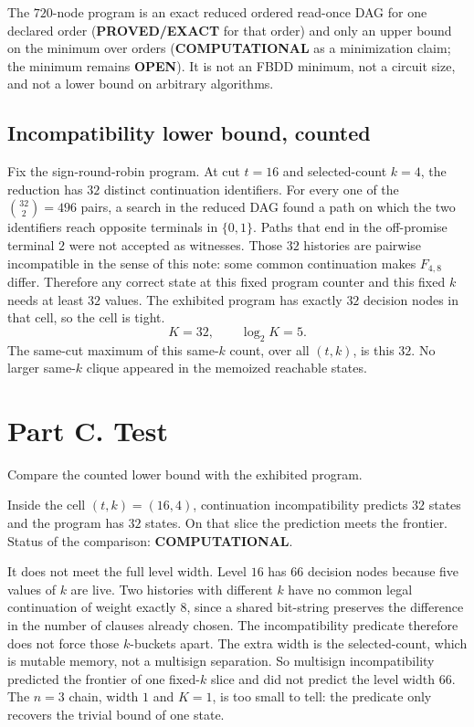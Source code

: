\documentclass[11pt]{article}
\begin{document}
The \(720\)-node program is an exact reduced ordered read-once DAG for one declared order (\textbf{PROVED/EXACT} for that order) and only an upper bound on the minimum over orders (\textbf{COMPUTATIONAL} as a minimization claim; the minimum remains \textbf{OPEN}).
It is not an FBDD minimum, not a circuit size, and not a lower bound on arbitrary algorithms.

\subsection*{Incompatibility lower bound, counted}
Fix the sign-round-robin program.
At cut \(t=16\) and selected-count \(k=4\), the reduction has \(32\) distinct continuation identifiers.
For every one of the \(\binom{32}{2}=496\) pairs, a search in the reduced DAG found a path on which the two identifiers reach opposite terminals in \(\{0,1\}\).
Paths that end in the off-promise terminal \(2\) were not accepted as witnesses.
Those \(32\) histories are pairwise incompatible in the sense of this note: some common continuation makes \(F_{4,8}\) differ.
Therefore any correct state at this fixed program counter and this fixed \(k\) needs at least \(32\) values.
The exhibited program has exactly \(32\) decision nodes in that cell, so the cell is tight.
\[
K=32,\qquad \log_2 K=5.
\]
The same-cut maximum of this same-\(k\) count, over all \((t,k)\), is this \(32\).
No larger same-\(k\) clique appeared in the memoized reachable states.

\section{Part C. Test}

Compare the counted lower bound with the exhibited program.

Inside the cell \((t,k)=(16,4)\), continuation incompatibility predicts \(32\) states and the program has \(32\) states.
On that slice the prediction meets the frontier.
Status of the comparison: \textbf{COMPUTATIONAL}.

It does not meet the full level width.
Level \(16\) has \(66\) decision nodes because five values of \(k\) are live.
Two histories with different \(k\) have no common legal continuation of weight exactly \(8\), since a shared bit-string preserves the difference in the number of clauses already chosen.
The incompatibility predicate therefore does not force those \(k\)-buckets apart.
The extra width is the selected-count, which is mutable memory, not a multisign separation.
So multisign incompatibility predicted the frontier of one fixed-\(k\) slice and did not predict the level width \(66\).
The \(n=3\) chain, width \(1\) and \(K=1\), is too small to tell: the predicate only recovers the trivial bound of one state.
\end{document}
